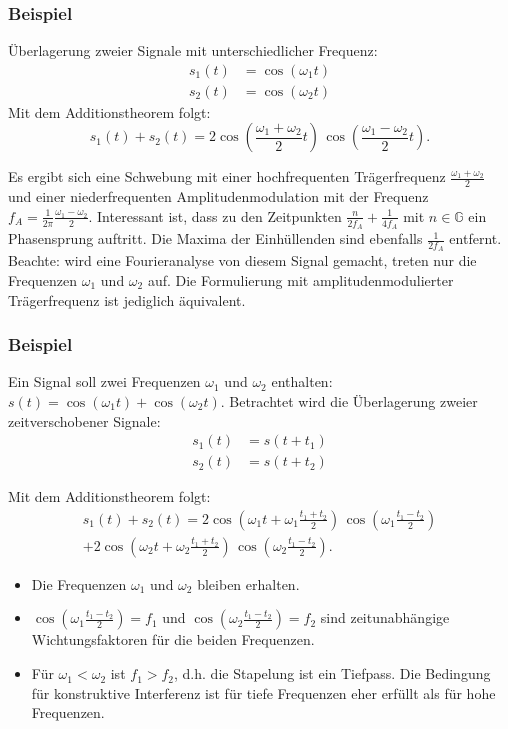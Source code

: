 \subsubsection*{Beispiel}
Überlagerung zweier Signale mit unterschiedlicher Frequenz:
\begin{align*}
s_1(t) & = \cos(\omega_1 t)\\
s_2(t) &= \cos(\omega_2 t)
\end{align*}
Mit dem Additionstheorem folgt:
\begin{equation}
s_1(t)+s_2(t)= 2 \cos \left(\frac{\omega_1+\omega_2}{2}t\right)\, \cos \left(\frac{\omega_1-\omega_2}{2}t\right).
\end{equation}

Es ergibt sich eine Schwebung mit einer hochfrequenten Trägerfrequenz $\frac{\omega_1+\omega_2}{2}$ und einer niederfrequenten Amplitudenmodulation mit der Frequenz $f_A = \frac{1}{2\pi}\frac{\omega_1-\omega_2}{2}$. Interessant ist, dass zu den Zeitpunkten $\frac{n}{2f_A}+\frac{1}{4f_A}$ mit $n \in \mathbb{G}$ ein Phasensprung auftritt. Die Maxima der Einhüllenden sind ebenfalls $\frac{1}{2f_A}$ entfernt. Beachte: wird eine Fourieranalyse von diesem Signal gemacht, treten nur die Frequenzen $\omega_1$ und $\omega_2$ auf. Die Formulierung mit amplitudenmodulierter Trägerfrequenz ist jediglich äquivalent.\\ 

\subsubsection*{Beispiel}
Ein Signal soll zwei Frequenzen $\omega_1$ und $\omega_2$ enthalten: $s(t) = \cos (\omega_1t) + \cos(\omega_2t)$. Betrachtet wird die Überlagerung zweier zeitverschobener Signale:
\begin{align*}
s_1(t) &=s(t+t_1)\\
s_2(t) &=s(t+t_2)
\end{align*}

Mit dem Additionstheorem folgt:
\begin{multline}
s_1(t)+s_2(t)= 2 \cos \left(\omega_1 t +\omega_1\frac{t_1+t_2}{2}\right)\, \cos \left(\omega_1\frac{t_1-t_2}{2}\right)\\
+2 \cos \left(\omega_2 t +\omega_2\frac{t_1+t_2}{2}\right)\, \cos\left(\omega_2\frac{t_1-t_2}{2}\right).
\end{multline}

\begin{itemize}
\item Die Frequenzen $\omega_1$ und $\omega_2$ bleiben erhalten.
\item $\cos (\omega_1\frac{t_1-t_2}{2})=f_1$ und $ \cos(\omega_2\frac{t_1-t_2}{2})=f_2$ sind zeitunabhängige Wichtungsfaktoren für die beiden Frequenzen.
\item Für $\omega_1<\omega_2$ ist $f_1>f_2$, d.h. die Stapelung ist ein Tiefpass. Die Bedingung für konstruktive Interferenz ist für tiefe Frequenzen eher erfüllt als für hohe Frequenzen. 
\end{itemize}

